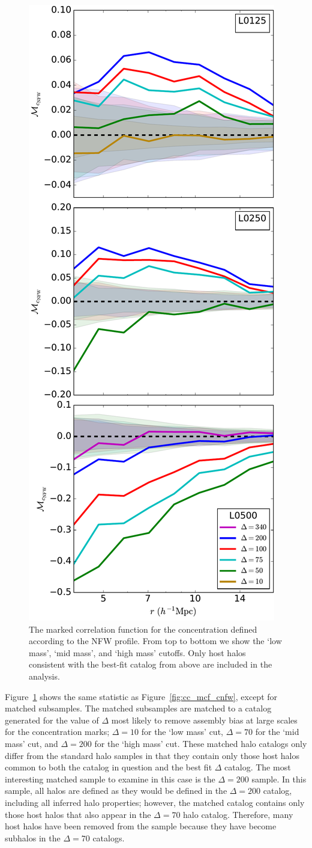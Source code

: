 \documentclass[usenatbib,usegraphicx,letterpaper]{mn2e}
\begin{document}
\begin{figure}
	\centering
	\includegraphics[width=.4\textwidth]{match_mcf_cNFW.pdf}
	\caption{The marked correlation function for the concentration defined according to the NFW profile. From top to bottom we show the `low mass', `mid mass', and `high mass' cutoffs. Only host halos consistent with the best-fit catalog from above are included in the analysis.}
	\label{fig:hvm_mcf_cnfw}
\end{figure}

Figure~\ref{fig:hvm_mcf_cnfw} shows the same statistic as Figure~\ref{fig:cc_mcf_cnfw}, except for matched
subsamples. The matched subsamples are matched to a catalog generated for the value of $\Delta$ most likely to
remove assembly bias at large scales for the concentration marks; $\Delta=10$ for the `low mass' cut, $\Delta=70$
for the `mid mass' cut, and $\Delta=200$ for the `high mass' cut. These matched halo catalogs only differ from
the standard halo samples in that they contain only those host halos common 
to both the catalog in question and the best fit $\Delta$ catalog. The most interesting matched sample to 
examine in this case is the $\Delta=200$ sample. In this sample, all halos are defined as they would be 
defined in the $\Delta=200$ catalog, including all inferred halo properties; however, the matched catalog 
contains only those host halos that also appear in the $\Delta=70$ halo catalog. Therefore, many host 
halos have been removed from the sample because they have become subhalos in the $\Delta=70$ 
catalogs. 
\end{document}
